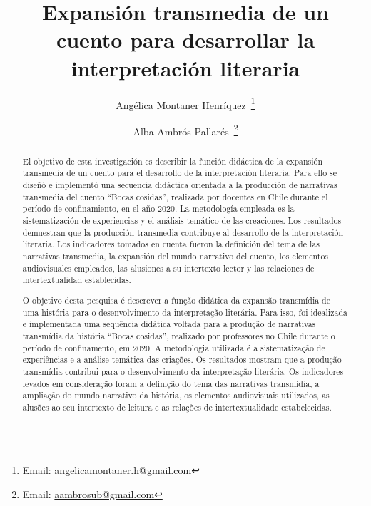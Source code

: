 \documentclass[spanish]{textolivre}
\title{Expansión transmedia de un cuento para desarrollar la interpretación literaria}
\author[1]{Angélica Montaner Henríquez~\orcid{0000-0003-1352-8544}\thanks{Email: \href{mailto:angelicamontaner.h@gmail.com}{angelicamontaner.h@gmail.com}}}
\author[2]{Alba Ambrós-Pallarés~\orcid{0000-0002-4450-2067}\thanks{Email: \href{mailto:aambrosub@gmail.com}{aambrosub@gmail.com}}}
\affil[1]{Escuela Diego Portales, San Bernardo, Región Metropolitana, Chile.}
\affil[2]{Universidad de Barcelona, Barcelona, España.}
\begin{document}
\maketitle

\begin{polyabstract}
\begin{abstract}
El objetivo de esta investigación es describir la función didáctica de la expansión transmedia de un cuento para el desarrollo de la interpretación literaria. Para ello se diseñó e implementó una secuencia didáctica orientada a la producción de narrativas transmedia del cuento “Bocas cosidas”, realizada por docentes en Chile durante el período de confinamiento, en el año 2020. La metodología empleada es la sistematización de experiencias y el análisis temático de las creaciones. Los resultados demuestran que la producción transmedia contribuye al desarrollo de la interpretación literaria. Los indicadores tomados en cuenta fueron la definición del tema de las narrativas transmedia, la expansión del mundo narrativo del cuento, los elementos audiovisuales empleados, las alusiones a su intertexto lector y las relaciones de intertextualidad establecidas.

\end{abstract}

\begin{portuguese}
\begin{abstract}
O objetivo desta pesquisa é descrever a função didática da expansão transmídia de uma história para o desenvolvimento da interpretação literária. Para isso, foi idealizada e implementada uma sequência didática voltada para a produção de narrativas transmídia da história “Bocas cosidas”, realizado por professores no Chile durante o período de confinamento, em 2020. A metodologia utilizada é a sistematização de experiências e a análise temática das criações. Os resultados mostram que a produção transmídia contribui para o desenvolvimento da interpretação literária. Os indicadores levados em consideração foram a definição do tema das narrativas transmídia, a ampliação do mundo narrativo da história, os elementos audiovisuais utilizados, as alusões ao seu intertexto de leitura e as relações de intertextualidade estabelecidas.

\end{abstract}
\end{portuguese}


\end{polyabstract}
\end{document}
